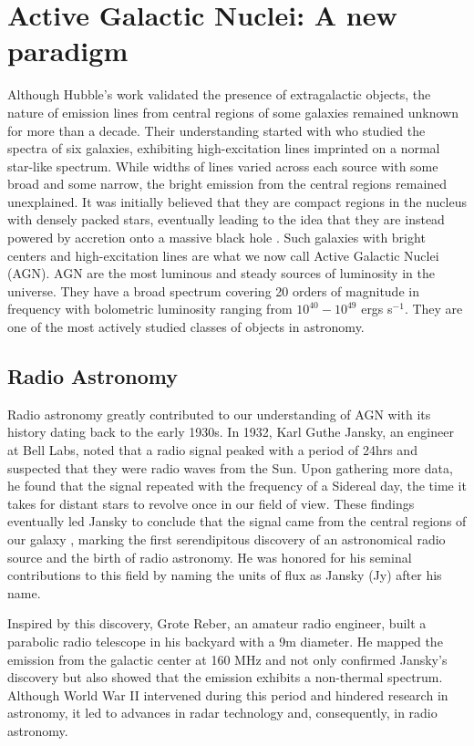 \section{Active Galactic Nuclei: A new paradigm}
Although Hubble's work validated the presence of extragalactic objects, the nature of emission lines from central regions of some galaxies remained unknown for more than a decade. Their understanding started with \citet{seyfert1943nuclear} who studied the spectra of six galaxies, exhibiting high-excitation lines imprinted on a normal star-like spectrum. While widths of lines varied across each source with some broad and some narrow, the bright emission from the central regions remained unexplained. It was initially believed that they are compact regions in the nucleus with densely packed stars, eventually leading to the idea that they are instead powered by accretion onto a massive black hole \citep{salpeter1964accretion,zel1964estimating}. Such galaxies with bright centers and high-excitation lines are what we now call Active Galactic Nuclei (AGN). AGN are the most luminous and steady sources of luminosity in the universe. They have a broad spectrum covering 20 orders of magnitude in frequency with bolometric luminosity ranging from $10^{40}-10^{49}$ ergs s$^{-1}$. They are one of the most actively studied classes of objects in astronomy.

\subsection{Radio Astronomy}
Radio astronomy greatly contributed to our understanding of AGN with its history dating back to the early 1930s. In 1932, Karl Guthe Jansky, an engineer at Bell Labs, noted that a radio signal peaked with a period of 24hrs and suspected that they were radio waves from the Sun. Upon gathering more data, he found that the signal repeated with the frequency of a Sidereal day, the time it takes for distant stars to revolve once in our field of view. These findings eventually led Jansky to conclude that the signal came from the central regions of our galaxy \citep{jansky1932directional}, marking the first serendipitous discovery of an astronomical radio source and the birth of radio astronomy. He was honored for his seminal contributions to this field by naming the units of flux as Jansky (Jy) after his name.

Inspired by this discovery, Grote Reber, an amateur radio engineer, built a parabolic radio telescope in his backyard with a 9m diameter. He mapped the emission from the galactic center at 160 MHz and not only confirmed Jansky's discovery \citep{reber1940cosmic} but also showed that the emission exhibits a non-thermal spectrum. Although World War II intervened during this period and hindered research in astronomy, it led to advances in radar technology and, consequently, in radio astronomy. 

